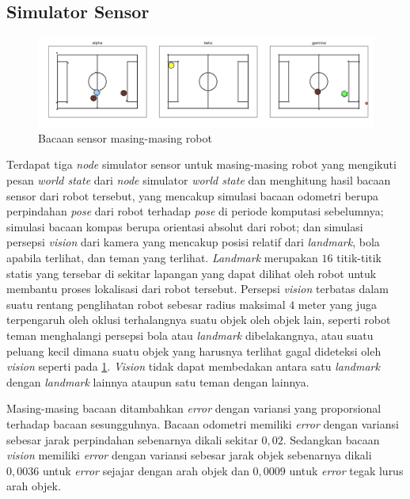 \subsection{Simulator Sensor}

\begin{figure}[h]
    \centering
    \medskip
    \includegraphics[width=\textwidth]{resources/allies-sensor.png}
    \caption{Bacaan sensor masing-masing robot}
    \label{fig:allies-sensor}
    \bigskip
\end{figure}

Terdapat tiga \textit{node} simulator sensor untuk masing-masing robot yang mengikuti pesan \textit{world state} dari \textit{node} simulator \textit{world state} dan menghitung hasil bacaan sensor dari robot tersebut, yang mencakup simulasi bacaan odometri berupa perpindahan \textit{pose} dari robot terhadap \textit{pose} di periode komputasi sebelumnya; simulasi bacaan kompas berupa orientasi absolut dari robot; dan simulasi persepsi \textit{vision} dari kamera yang mencakup posisi relatif dari \textit{landmark}, bola apabila terlihat, dan teman yang terlihat. \textit{Landmark} merupakan $16$ titik-titik statis yang tersebar di sekitar lapangan yang dapat dilihat oleh robot untuk membantu proses lokalisasi dari robot tersebut. Persepsi \textit{vision} terbatas dalam suatu rentang penglihatan robot sebesar radius maksimal $4$ meter yang juga terpengaruh oleh oklusi terhalangnya suatu objek oleh objek lain, seperti robot teman menghalangi persepsi bola atau \textit{landmark} dibelakangnya, atau suatu peluang kecil dimana suatu objek yang harusnya terlihat gagal dideteksi oleh \textit{vision} seperti pada \ref{fig:allies-sensor}. \textit{Vision} tidak dapat membedakan antara satu \textit{landmark} dengan \textit{landmark} lainnya ataupun satu teman dengan lainnya.

Masing-masing bacaan ditambahkan \textit{error} dengan variansi yang proporsional terhadap bacaan sesungguhnya. Bacaan odometri memiliki \textit{error} dengan variansi sebesar jarak perpindahan sebenarnya dikali sekitar $0,02$. Sedangkan bacaan \textit{vision} memiliki \textit{error} dengan variansi sebesar jarak objek sebenarnya dikali $0,0036$ untuk \textit{error} sejajar dengan arah objek dan $0,0009$ untuk \textit{error} tegak lurus arah objek.

